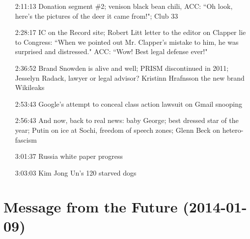 \documentclass{report}
\newcommand{\mono}[1]{{\fontspec{Courier}#1}}
\begin{document}
\begin{itemize}
\item[\mono{2:11:13}] Donation segment \#2; venison black bean chili, ACC: ``Oh look, here's the pictures of the deer it came from!"; Club 33
\item[\mono{2:28:17}] IC on the Record site; Robert Litt letter to the editor on Clapper lie to Congress: ``When we pointed out Mr. Clapper's mistake to him, he was surprised and distressed." ACC: ``Wow! Best legal defense ever!"
\item[\mono{2:36:52}] Brand Snowden is alive and well; PRISM discontinued in 2011; Jesselyn Radack, lawyer or legal advisor? Kristinn Hrafnsson the new brand Wikileaks
\item[\mono{2:53:43}] Google's attempt to conceal class action lawsuit on Gmail snooping
\item[\mono{2:56:43}] And now, back to real news: baby George; best dressed star of the year; Putin on ice at Sochi, freedom of speech zones; Glenn Beck on hetero-fascism
\item[\mono{3:01:37}] Russia white paper progress
\item[\mono{3:03:03}] Kim Jong Un's 120 starved dogs
\end{itemize}
\setcounter{section}{581}\section[Message from the Future]{Message from the Future \small{(2014-01-09)}}
\end{document}
